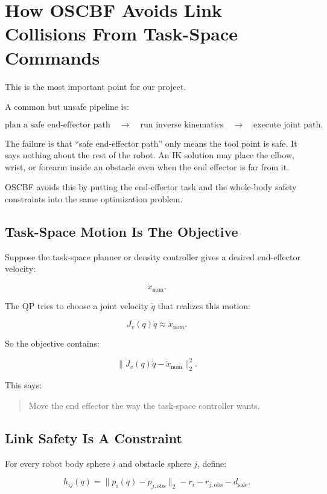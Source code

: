 \documentclass[11pt]{article}
\begin{document}
\section{How OSCBF Avoids Link Collisions From Task-Space Commands}

This is the most important point for our project.

A common but unsafe pipeline is:

\[
\text{plan a safe end-effector path}
\quad \rightarrow \quad
\text{run inverse kinematics}
\quad \rightarrow \quad
\text{execute joint path}.
\]

The failure is that ``safe end-effector path'' only means the tool point is
safe. It says nothing about the rest of the robot. An IK solution may place the
elbow, wrist, or forearm inside an obstacle even when the end effector is far
from it.

OSCBF avoids this by putting the end-effector task and the whole-body safety
constraints into the same optimization problem.

\subsection{Task-Space Motion Is The Objective}

Suppose the task-space planner or density controller gives a desired
end-effector velocity:

\[
\dot{x}_{\mathrm{nom}}.
\]

The QP tries to choose a joint velocity $\dot{q}$ that realizes this motion:

\[
J_v(q)\dot{q} \approx \dot{x}_{\mathrm{nom}}.
\]

So the objective contains:

\[
\|J_v(q)\dot{q} - \dot{x}_{\mathrm{nom}}\|_2^2.
\]

This says:

\begin{quote}
Move the end effector the way the task-space controller wants.
\end{quote}

\subsection{Link Safety Is A Constraint}

For every robot body sphere $i$ and obstacle sphere $j$, define:

\[
h_{ij}(q)
= \|p_i(q) - p_{j,\mathrm{obs}}\|_2
- r_i
- r_{j,\mathrm{obs}}
- d_{\mathrm{safe}}.
\]
\end{document}
